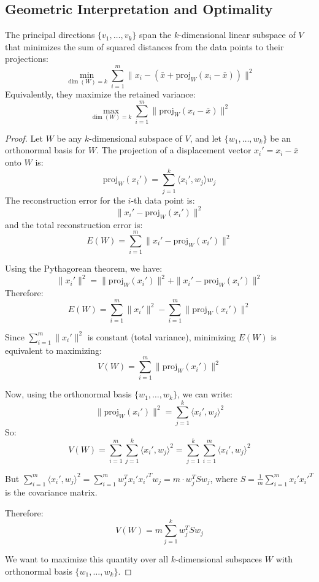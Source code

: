 \begin{notechapter}
\section{Geometric Interpretation and Optimality}

\begin{theorem}
The principal directions $\{v_1, \dots, v_k\}$ span the $k$-dimensional linear subspace of $V$ that minimizes the sum of squared distances from the data points to their projections:
\[
\min_{\dim(W)=k} \sum_{i=1}^m \|x_i - (\bar{x} + \text{proj}_W(x_i - \bar{x}))\|^2
\]
Equivalently, they maximize the retained variance:
\[
\max_{\dim(W)=k} \sum_{i=1}^m \|\text{proj}_W(x_i - \bar{x})\|^2
\]
\end{theorem}

\begin{proof}
Let $W$ be any $k$-dimensional subspace of $V$, and let $\{w_1, \dots, w_k\}$ be an orthonormal basis for $W$. The projection of a displacement vector $x_i' = x_i - \bar{x}$ onto $W$ is:
\[
\text{proj}_W(x_i') = \sum_{j=1}^k \langle x_i', w_j \rangle w_j
\]
The reconstruction error for the $i$-th data point is:
\[
\|x_i' - \text{proj}_W(x_i')\|^2
\]
and the total reconstruction error is:
\[
E(W) = \sum_{i=1}^m \|x_i' - \text{proj}_W(x_i')\|^2
\]

Using the Pythagorean theorem, we have:
\[
\|x_i'\|^2 = \|\text{proj}_W(x_i')\|^2 + \|x_i' - \text{proj}_W(x_i')\|^2
\]
Therefore:
\[
E(W) = \sum_{i=1}^m \|x_i'\|^2 - \sum_{i=1}^m \|\text{proj}_W(x_i')\|^2
\]

Since $\sum_{i=1}^m \|x_i'\|^2$ is constant (total variance), minimizing $E(W)$ is equivalent to maximizing:
\[
V(W) = \sum_{i=1}^m \|\text{proj}_W(x_i')\|^2
\]

Now, using the orthonormal basis $\{w_1, \dots, w_k\}$, we can write:
\[
\|\text{proj}_W(x_i')\|^2 = \sum_{j=1}^k \langle x_i', w_j \rangle^2
\]
So:
\[
V(W) = \sum_{i=1}^m \sum_{j=1}^k \langle x_i', w_j \rangle^2 = \sum_{j=1}^k \sum_{i=1}^m \langle x_i', w_j \rangle^2
\]

But $\sum_{i=1}^m \langle x_i', w_j \rangle^2 = \sum_{i=1}^m w_j^T x_i' x_i'^T w_j = m \cdot w_j^T S w_j$, where $S = \frac{1}{m}\sum_{i=1}^m x_i' x_i'^T$ is the covariance matrix.

Therefore:
\[
V(W) = m \sum_{j=1}^k w_j^T S w_j
\]

We want to maximize this quantity over all $k$-dimensional subspaces $W$ with orthonormal basis $\{w_1, \dots, w_k\}$.


\end{proof}
\end{notechapter}
